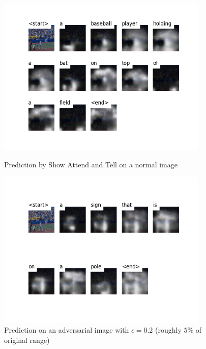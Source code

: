 \begin{figure}[ht]
    \centering
    \begin{minipage}{0.45\textwidth}
        \centering
        \includegraphics[width=0.9\textwidth]{figures/caption_baseball_normal.png} %
        \caption{Prediction by Show Attend and Tell on a normal image}
    \end{minipage}\hfill
    \begin{minipage}{0.45\textwidth}
        \centering
        \includegraphics[width=0.9\textwidth]{figures/caption_baseball_adversarial.png} %
        \caption{Prediction on an adversarial image with $\epsilon=0.2$ (roughly $5\%$ of original range)}
    \end{minipage}
\end{figure}

